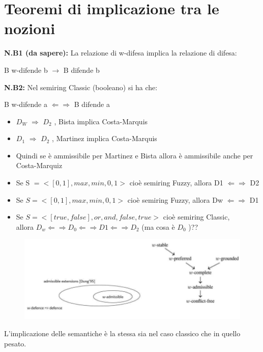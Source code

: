 \section{Teoremi di implicazione tra le nozioni}
\textbf{N.B1 (da sapere):} La relazione di w-difesa implica la relazione di difesa:
\begin{center}
    B w-difende b $\rightarrow$ B difende b
\end{center}
\textbf{N.B2:} Nel semiring Classic (booleano) si ha che:
\begin{center}
    B w-difende a $\Leftarrow \Rightarrow$ B difende a
\end{center}
\begin{itemize}
    \item $D_W$ $\Rightarrow$ $D_2$ , Bista implica Costa-Marquis
    \item $D_1$ $\Rightarrow$ $D_2$ , Martinez implica Costa-Marquis
    \item Quindi se è ammissibile per Martinez e Bista allora è ammissibile anche per Costa-Marquiz
    \item Se S $=< [0, 1], max, min, 0, 1 > $ cioè semiring Fuzzy, allora D1 $\Leftarrow \Rightarrow$ D2
    \item Se $S =< [0, 1], max, min, 0, 1 >$ cioè semiring Fuzzy, allora Dw $\Leftarrow \Rightarrow$ D1
    \item Se $S =< [true, false], or, and, false, true >$ cioè semiring Classic, 
    \\allora $D_w \Leftarrow \Rightarrow D_0 \Leftarrow \Rightarrow D1 \Leftarrow \Rightarrow D_2$ (ma cosa è $D_0$ )??
\end{itemize}
\begin{figure}[htp]
	\centering
    \includegraphics[width=12cm, keepaspectratio]{img/Cap6/teor.png}
\end{figure}
L’implicazione delle semantiche è la stessa sia nel caso classico che in quello pesato.
\newpage
